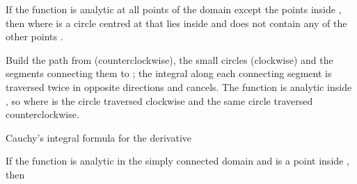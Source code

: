 \begin{EMtheorem}{}

If the function  is analytic at all points of the domain  except the points  inside , then
where  is a circle centred at  that lies inside  and does not contain any of the other points .

\end{EMtheorem}


\begin{EMproof}

Build the path \EMim{\Gamma} from  (counterclockwise), the small circles  (clockwise) and the segments connecting them to ; the integral along each connecting segment is traversed twice in opposite directions and cancels. The function is analytic inside \EMim{\Gamma}, so
where  is the circle  traversed clockwise and  the same circle traversed counterclockwise.

\end{EMproof}


\EMhold


\begin{EMtheorem}{Cauchy's integral formula for the derivative}

If the function  is analytic in the simply connected domain  and  is a point inside , then

\end{EMtheorem}

